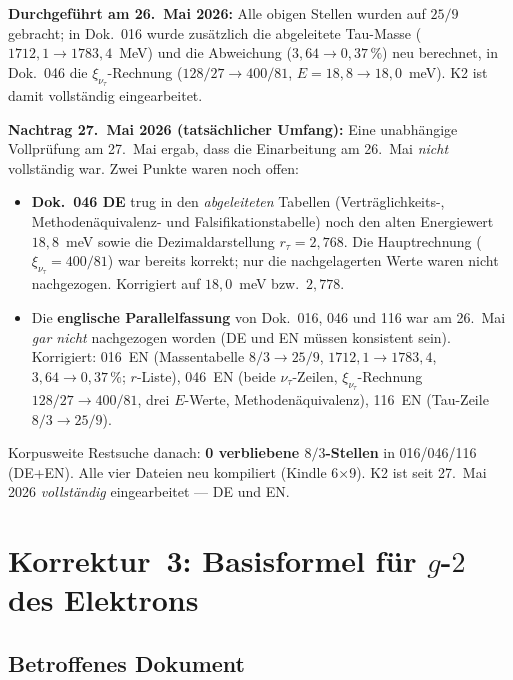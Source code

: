 \noindent\textbf{Durchgeführt am 26.~Mai 2026:} Alle obigen Stellen
wurden auf $25/9$ gebracht; in Dok.~016 wurde zusätzlich die
abgeleitete Tau-Masse ($1712{,}1 \to 1783{,}4$~MeV) und die Abweichung
($3{,}64 \to 0{,}37\,\%$) neu berechnet, in Dok.~046 die
$\xi_{\nu_\tau}$-Rechnung ($128/27 \to 400/81$, $E = 18{,}8 \to
18{,}0$~meV). K2 ist damit vollständig eingearbeitet.

\medskip
\noindent\textbf{Nachtrag 27.~Mai 2026 (tatsächlicher Umfang):} Eine
unabhängige Vollprüfung am 27.~Mai ergab, dass die Einarbeitung am 26.~Mai
\emph{nicht} vollständig war. Zwei Punkte waren noch offen:
\begin{itemize}
  \item \textbf{Dok.~046 DE} trug in den \emph{abgeleiteten} Tabellen
        (Verträglichkeits-, Methodenäquivalenz- und Falsifikationstabelle)
        noch den alten Energiewert $18{,}8$~meV sowie die Dezimaldarstellung
        $r_\tau = 2{,}768$. Die Hauptrechnung ($\xi_{\nu_\tau} = 400/81$) war
        bereits korrekt; nur die nachgelagerten Werte waren nicht nachgezogen.
        Korrigiert auf $18{,}0$~meV bzw.\ $2{,}778$.
  \item Die \textbf{englische Parallelfassung} von Dok.~016, 046 und 116 war
        am 26.~Mai \emph{gar nicht} nachgezogen worden (DE und EN müssen
        konsistent sein). Korrigiert: 016~EN (Massentabelle $8/3 \to 25/9$,
        $1712{,}1 \to 1783{,}4$, $3{,}64 \to 0{,}37\,\%$; $r$-Liste),
        046~EN (beide $\nu_\tau$-Zeilen, $\xi_{\nu_\tau}$-Rechnung
        $128/27 \to 400/81$, drei $E$-Werte, Methodenäquivalenz),
        116~EN (Tau-Zeile $8/3 \to 25/9$).
\end{itemize}
\noindent Korpusweite Restsuche danach: \textbf{0 verbliebene $8/3$-Stellen}
in 016/046/116 (DE+EN). Alle vier Dateien neu kompiliert (Kindle 6×9).
K2 ist seit 27.~Mai 2026 \emph{vollständig} eingearbeitet --- DE und EN.

\section{\texorpdfstring{Korrektur~3: Basisformel für $g$-$2$ des Elektrons}{Korrektur 3: Basisformel fuer g-2 des Elektrons}}

\subsection*{Betroffenes Dokument}

